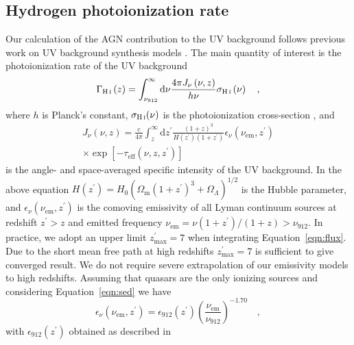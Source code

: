 \documentclass[fleqn,usenatbib]{mnras}
\newcommand{\new}[1]{{\color{notecolor} #1}}
\begin{document}
\subsection{Hydrogen photoionization rate}
\label{sec:gammahi}

Our calculation of the AGN contribution to the UV background follows
previous work on UV background synthesis models
\citep[e.g.][]{1996ApJ...461...20H,2012ApJ...746..125H}.  The main
quantity of interest is the  photoionization rate of the UV
background
\begin{equation}
  \Gamma_\ion{H}{i}\left(z\right)=\int_{\nu_{912}}^\infty\mathrm{d}\nu
  \frac{4\pi J_\nu\left(\nu,z\right)}{h\nu} \sigma_\ion{H}{i}\left(\nu\right)\quad,
  \label{eqn:gammapi}
\end{equation}
where $h$ is Planck's constant, $\sigma_\ion{H}{i}(\nu)$ is the
 photoionization cross-section \citep{1997MNRAS.292...27H,
  2011piim.book.....D}, and
\begin{multline}
  J_\nu(\nu, z)=\frac{c}{4\pi}\int_{z}^\infty\mathrm{d}z^\prime\frac{\left(1+z\right)^3}{H\left(z^\prime\right)\left(1+z^\prime\right)}\epsilon_\nu\left(\nu_\mathrm{em},z^\prime\right)\\
  \times\exp{\left[-\tau_\mathrm{eff}\left(\nu, z, z^\prime\right)\right]}
  \label{eqn:flux}
\end{multline}
is the angle- and space-averaged specific intensity of the UV
background. In the above equation
$H\left(z^\prime\right)=H_0(\Omega_\mathrm{m}\left(1+z^\prime\right)^3+\Omega_\Lambda)^{1/2}$
is the Hubble parameter, and
$\epsilon_\nu\left(\nu_\mathrm{em},z^\prime\right)$ is the comoving
emissivity of all  Lyman continuum sources at redshift
$z^\prime>z$ and emitted frequency
$\nu_\mathrm{em}=\nu\left(1+z^\prime\right)/\left(1+z\right)>\nu_{912}$.
In practice, we adopt an upper limit $z^\prime_\mathrm{max}=7$ when
integrating Equation~\eqref{eqn:flux}.  \new{Due to the short mean
  free path at high redshifts $z^\prime_\mathrm{max}=7$ is sufficient
  to give converged result.  We do not require severe extrapolation of
  our emissivity models to high redshifts.} Assuming that quasars are
the only ionizing sources and considering Equation~\eqref{eqn:sed} we
have
\begin{equation}
  \epsilon_\nu\left(\nu_\mathrm{em},z^\prime\right) = \epsilon_{912}\left(z^\prime\right)\left(\frac{\nu_\mathrm{em}}{\nu_{912}}\right)^{-1.70}\quad,
  \label{eqn:epsilon_freq}
\end{equation}
with $\epsilon_{912}\left(z^\prime\right)$ obtained as described in
\end{document}
